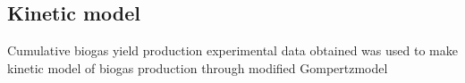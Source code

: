 \subsection{Kinetic model}
Cumulative biogas yield production experimental data obtained was used to make kinetic model of biogas production through modified Gompertzmodel